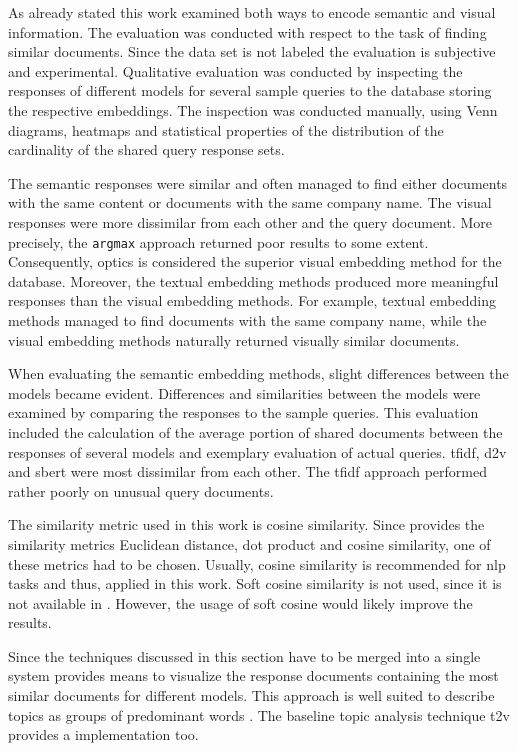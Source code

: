 As already stated this work examined both ways to encode semantic and visual information.
The evaluation was conducted with respect to the task of finding similar documents.
Since the data set is not labeled the evaluation is subjective and experimental.
Qualitative evaluation was conducted by inspecting the responses of different models for several sample queries to the database 
storing the respective embeddings.
The inspection was conducted manually, 
using Venn diagrams, heatmaps and 
statistical properties of the distribution of the cardinality of the shared query response sets.

The semantic responses were similar and often managed to find either documents with the same content or documents with the same company name.
The visual responses were more dissimilar from each other and the query document.
More precisely, the \texttt{argmax} approach returned poor results to some extent.
Consequently, \ac{optics} is considered the superior visual embedding method for the database.
Moreover, the textual embedding methods produced more meaningful responses than the visual embedding methods.
For example, textual embedding methods managed to find documents with the same company name, 
while the visual embedding methods naturally returned visually similar documents.


When evaluating the semantic embedding methods, slight differences between the models became evident.
Differences and similarities between the models were examined by comparing the responses to the sample queries.
This evaluation included the calculation of the average portion of shared documents between the responses of several models 
and exemplary evaluation of actual queries.
\ac{tfidf}, \ac{d2v} and \ac{sbert} were most dissimilar from each other.
The \ac{tfidf} approach performed rather poorly on unusual query documents.


The similarity metric used in this work is cosine similarity.
Since \databaseName{} provides the similarity metrics Euclidean distance, dot product and cosine similarity,
one of these metrics had to be chosen.
Usually, cosine similarity is recommended for \ac{nlp} tasks and thus, applied in this work.
Soft cosine similarity is not used, since it is not available in \databaseName{}.
However, the usage of soft cosine would likely improve the results.

Since the techniques discussed in this section have to be merged into a single system 
\wordcloud{} provides means to visualize the response documents containing the most similar documents for different models.
This approach is well suited to describe topics as groups of predominant words \cite{topic_modeling2019}.
The baseline topic analysis technique \ac{t2v} provides a \wordcloud{} implementation too.

